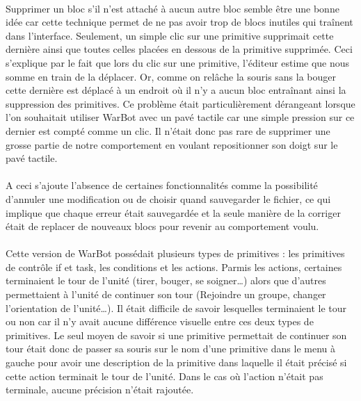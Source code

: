 \documentclass{report}
\begin{document}
\paragraph{}
    Supprimer un bloc s’il n’est attaché à aucun autre bloc semble être une bonne idée car cette technique permet de ne pas avoir trop de blocs inutiles qui traînent dans l’interface. Seulement, un simple clic sur une primitive supprimait cette dernière ainsi que toutes celles placées en dessous de la primitive supprimée. Ceci s’explique par le fait que lors du clic sur une primitive, l’éditeur estime que nous somme en train de la déplacer. Or, comme on relâche la souris sans la bouger cette dernière est déplacé à un endroit où il n’y a aucun bloc entraînant ainsi la suppression des primitives. \newline
Ce problème était particulièrement dérangeant lorsque l’on souhaitait utiliser WarBot avec un pavé tactile car une simple pression sur ce dernier est compté comme un clic. Il n’était donc pas rare de supprimer une grosse partie de notre comportement en voulant repositionner son doigt sur le pavé tactile.
\paragraph{}
    A ceci s’ajoute l’absence de certaines fonctionnalités comme la possibilité d’annuler une modification ou de choisir quand sauvegarder le fichier, ce qui implique que chaque erreur était sauvegardée et la seule manière de la corriger était de replacer de nouveaux blocs pour revenir au comportement voulu.
\paragraph{}
    Cette version de WarBot possédait plusieurs types de primitives : les primitives de contrôle if et task, les conditions et les actions. Parmis les actions, certaines terminaient le tour de l’unité (tirer, bouger, se soigner…) alors que d’autres permettaient à l’unité de continuer son tour (Rejoindre un groupe, changer l’orientation de l’unité…). Il était difficile de savoir lesquelles terminaient le tour ou non car il n’y avait aucune différence visuelle entre ces deux types de primitives. Le seul moyen de savoir si une primitive permettait de continuer son tour était donc de passer sa souris sur le nom d’une primitive dans le menu à gauche pour avoir une description de la primitive dans laquelle il était précisé si cette action terminait le tour de l’unité. Dans le cas où l’action n’était pas terminale, aucune précision n’était rajoutée.
\end{document}
